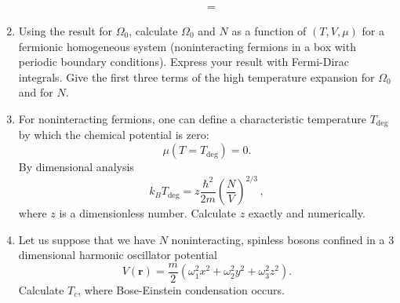 \documentclass[11pt, a4paper]{article}
\begin{document}
\begin{enumerate}
\begin{align*}
        & =
    \end{align*}
    \item Using the result for $\Omega_0$, calculate $\Omega_0$ and $N$ as a function of $(T,V,\mu)$
    for a fermionic homogeneous system (noninteracting fermions in a box with periodic boundary
    conditions). Express your result with Fermi-Dirac integrals. Give the first three terms of the
    high temperature expansion for $\Omega_0$ and for $N$.
    
    \item For noninteracting fermions, one can define a characteristic temperature $T_{\textrm{deg}}$
    by which the chemical potential is zero:
    \begin{equation*}
        \mu(T=T_{\textrm{deg}}) = 0.
    \end{equation*}
    By dimensional analysis
    \begin{equation*}
        k_BT_{\textrm{deg}} = z \frac{\hbar^2}{2m}\left(\frac{N}{V}\right)^{2/3}\,,
    \end{equation*}
    where $z$ is a dimensionless number. Calculate $z$ exactly and numerically.

    \item Let us suppose that we have $N$ noninteracting, spinless bosons confined in a
    3 dimensional harmonic oscillator potential
    \begin{equation*}
        V(\mathbf{r}) = \frac{m}{2}(\omega_1^2x^2 + \omega_2^2y^2 + \omega_3^2z^2).
    \end{equation*}
    Calculate $T_c$, where Bose-Einstein condensation occurs.
\end{enumerate}
\end{document}
